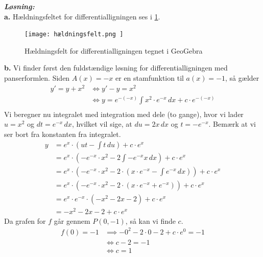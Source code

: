 \documentclass{article}
\newcommand{\sol}{\setlength{\parindent}{0cm}\textbf{\textit{Løsning:}}\setlength{\parindent}{1cm}}
\begin{document}
\sol \\
\textbf{a.}
Hældningsfeltet for differentialligningen ses i \cref{fig:hældningsfelt}.
\begin{figure}[H]
\begin{center}
  \texttt{[image: hældningsfelt.png ]}
\end{center}
\caption{Hældningsfelt for differentialligningen tegnet i GeoGebra}
\label{fig:hældningsfelt}
\end{figure}
\textbf{b.}
Vi finder først den fuldstændige løsning for differentialligningen med panserformlen.
Siden $A(x)=-x$ er en stamfunktion til $a(x)=-1$, så gælder
\begin{equation*}
\begin{split}
  y'=y+x^2 &\iff y'-y=x^2\\
  &\iff y= e^{-(-x)} \int x^2 \cdot e^{-x}  \,dx + c \cdot e^{-(-x)} \\
\end{split}
\end{equation*}
Vi beregner nu integralet med integration med dele (to gange), hvor vi lader $u=x^2$ og $dt=e^{-x}\, dx$, hvilket vil sige, at $du=2x \, dx$ og $t=-e^{-x} $. 
Bemærk at vi ser bort fra konstanten fra integralet.
\begin{equation*}
\begin{split}
  y&=e^{x} \cdot \left(ut- \int t \,du \right) + c \cdot e^{x} \\
  &=e^{x} \cdot \left(-e^{-x} \cdot x^2 - 2\int -e^{-x} x \,dx  \right) + c \cdot e^{x} \\
  &=e^{x} \cdot \left(-e^{-x} \cdot x^2 - 2 \cdot \left(x \cdot e^{-x} - \int e^{-x}  \,dx \right) \right) + c \cdot e^{x} \\
  &=e^{x} \cdot \left(-e^{-x} \cdot x^2 - 2 \cdot \left(x \cdot e^{-x} +e^{-x} \right)  \right) + c \cdot e^{x} \\
  &=e^{x} \cdot e^{-x} \cdot \left(-x^2-2x-2\right) +c \cdot e^{x} \\
  &=-x^2-2x-2 + c \cdot e^{x} 
\end{split}
\end{equation*}
Da grafen for $f$ går gennem $P(0,-1)$, så kan vi finde $c$. 
\begin{equation*}
\begin{split}
  f(0)= -1 &\implies -0^2-2 \cdot 0-2+c \cdot e^{0} =-1\\
  &\iff c-2=-1\\
  &\iff c=1
\end{split}
\end{equation*}
\end{document}

